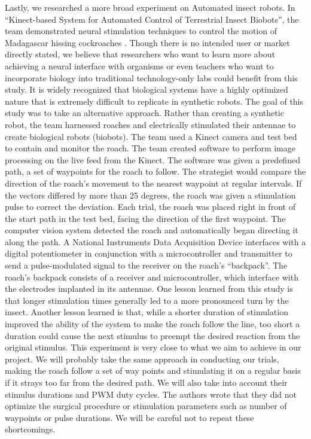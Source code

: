 \documentclass{article}
\begin{document}
 Lastly, we researched a more broad experiment on Automated insect robots. In ``Kinect-based System for Automated Control of Terrestrial Insect Biobots'', the team demonstrated neural stimulation techniques to control the motion of Madagascar hissing cockroaches \cite{whitmire2013kinect}. Though there is no intended user or market directly stated, we believe that researchers who want to learn more about achieving a neural interface with organisms or even teachers who want to incorporate biology into traditional technology-only labs could benefit from this study. It is widely recognized that biological systems have a highly optimized nature that is extremely difficult to replicate in synthetic robots. The goal of this study was to take an alternative approach. Rather than creating a synthetic robot, the team harnessed roaches and electrically stimulated their antennae to create biological robots (biobots). The team used a Kinect camera and test bed to contain and monitor the roach. The team created software to perform image processing on the live feed from the Kinect. The software was given a predefined path, a set of waypoints for the roach to follow. The strategist would compare the direction of the roach’s movement to the nearest waypoint at regular intervals. If the vectors differed by more than 25 degrees, the roach was given a stimulation pulse to correct the deviation. Each trial, the roach was placed right in front of the start path in the test bed, facing the direction of the first waypoint. The computer vision system detected the roach and automatically began directing it along the path. A National Instruments Data Acquisition Device interfaces with a digital potentiometer in conjunction with a microcontroller and transmitter to send a pulse-modulated signal to the receiver on the roach’s ``backpack''. The roach’s backpack consists of a receiver and microcontroller, which interface with the electrodes implanted in its antennae. One lesson learned from this study is that longer stimulation times generally led to a more pronounced turn by the insect. Another lesson learned is that, while a shorter duration of stimulation improved the ability of the system to make the roach follow the line, too short a duration could cause the next stimulus to preempt the desired reaction from the original stimulus. This experiment is very close to what we aim to achieve in our project. We will probably take the same approach in conducting our trials, making the roach follow a set of way points and stimulating it on a regular basis if it strays too far from the desired path. We will also take into account their stimulus durations and PWM duty cycles. The authors wrote that they did not optimize the surgical procedure or stimulation parameters such as number of waypoints or pulse durations. We will be careful not to repeat these shortcomings.
\end{document}
